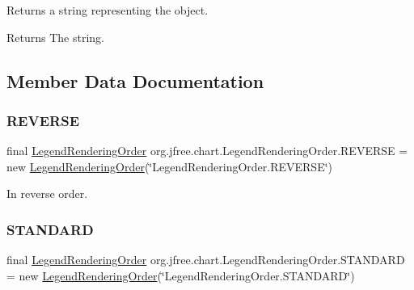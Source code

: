 Returns a string representing the object.

\begin{DoxyReturn}{Returns}
The string. 
\end{DoxyReturn}


\subsection{Member Data Documentation}
\mbox{\label{classorg_1_1jfree_1_1chart_1_1_legend_rendering_order_a54437266354fca7530f9816fb8e13969}} 
\subsubsection{\texorpdfstring{R\+E\+V\+E\+R\+SE}{REVERSE}}
{\footnotesize\ttfamily final \mbox{\hyperlink{classorg_1_1jfree_1_1chart_1_1_legend_rendering_order}{Legend\+Rendering\+Order}} org.\+jfree.\+chart.\+Legend\+Rendering\+Order.\+R\+E\+V\+E\+R\+SE = new \mbox{\hyperlink{classorg_1_1jfree_1_1chart_1_1_legend_rendering_order}{Legend\+Rendering\+Order}}(\char`\"{}Legend\+Rendering\+Order.\+R\+E\+V\+E\+R\+SE\char`\"{})\hspace{0.3cm}{\ttfamily [static]}}

In reverse order. \mbox{\label{classorg_1_1jfree_1_1chart_1_1_legend_rendering_order_afbcbadfb4e3205c9d4229b623bf95c79}} 
\subsubsection{\texorpdfstring{S\+T\+A\+N\+D\+A\+RD}{STANDARD}}
{\footnotesize\ttfamily final \mbox{\hyperlink{classorg_1_1jfree_1_1chart_1_1_legend_rendering_order}{Legend\+Rendering\+Order}} org.\+jfree.\+chart.\+Legend\+Rendering\+Order.\+S\+T\+A\+N\+D\+A\+RD = new \mbox{\hyperlink{classorg_1_1jfree_1_1chart_1_1_legend_rendering_order}{Legend\+Rendering\+Order}}(\char`\"{}Legend\+Rendering\+Order.\+S\+T\+A\+N\+D\+A\+RD\char`\"{})\hspace{0.3cm}{\ttfamily [static]}}

